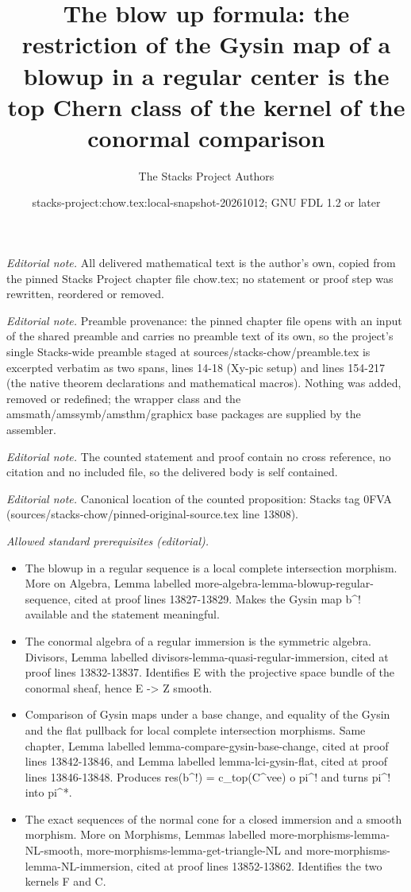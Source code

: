 \documentclass[10pt,a4paper]{amsart}
\title{The blow up formula: the restriction of the Gysin map of a blowup in a regular center is the top Chern class of the kernel of the conormal comparison}
\author{The Stacks Project Authors}
\date{stacks-project:chow.tex:local-snapshot-20261012; GNU FDL 1.2 or later}
\theoremstyle{plain}
\theoremstyle{definition}
\theoremstyle{remark}
\numberwithin{equation}{subsection}
\begin{document}
\maketitle
\noindent\textit{Editorial note.} All delivered mathematical text is the author's own, copied from the pinned Stacks Project chapter file chow.tex; no statement or proof step was rewritten, reordered or removed.\par\medskip
\noindent\textit{Editorial note.} Preamble provenance: the pinned chapter file opens with an input of the shared preamble and carries no preamble text of its own, so the project's single Stacks-wide preamble staged at sources/stacks-chow/preamble.tex is excerpted verbatim as two spans, lines 14-18 (Xy-pic setup) and lines 154-217 (the native theorem declarations and mathematical macros). Nothing was added, removed or redefined; the wrapper class and the amsmath/amssymb/amsthm/graphicx base packages are supplied by the assembler.\par\medskip
\noindent\textit{Editorial note.} The counted statement and proof contain no cross reference, no citation and no included file, so the delivered body is self contained.\par\medskip
\noindent\textit{Editorial note.} Canonical location of the counted proposition: Stacks tag 0FVA (sources/stacks-chow/pinned-original-source.tex line 13808).\par\medskip
\noindent\textit{Allowed standard prerequisites (editorial).}\begin{itemize}
\item The blowup in a regular sequence is a local complete intersection morphism. More on Algebra, Lemma labelled more-algebra-lemma-blowup-regular-sequence, cited at proof lines 13827-13829. Makes the Gysin map b\textasciicircum{}! available and the statement meaningful.
\item The conormal algebra of a regular immersion is the symmetric algebra. Divisors, Lemma labelled divisors-lemma-quasi-regular-immersion, cited at proof lines 13832-13837. Identifies E with the projective space bundle of the conormal sheaf, hence E -> Z smooth.
\item Comparison of Gysin maps under a base change, and equality of the Gysin and the flat pullback for local complete intersection morphisms. Same chapter, Lemma labelled lemma-compare-gysin-base-change, cited at proof lines 13842-13846, and Lemma labelled lemma-lci-gysin-flat, cited at proof lines 13846-13848. Produces res(b\textasciicircum{}!) = c\_top(C\textasciicircum{}vee) o pi\textasciicircum{}! and turns pi\textasciicircum{}! into pi\textasciicircum{}*.
\item The exact sequences of the normal cone for a closed immersion and a smooth morphism. More on Morphisms, Lemmas labelled more-morphisms-lemma-NL-smooth, more-morphisms-lemma-get-triangle-NL and more-morphisms-lemma-NL-immersion, cited at proof lines 13852-13862. Identifies the two kernels F and C.
\end{itemize}\medskip
\end{document}
